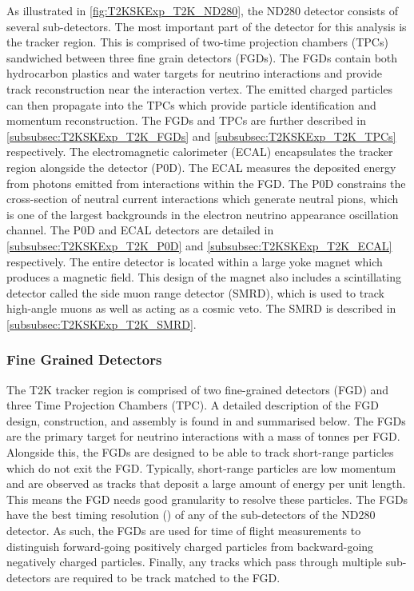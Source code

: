 As illustrated in \autoref{fig:T2KSKExp_T2K_ND280}, the ND280 detector consists of several sub-detectors. The most important part of the detector for this analysis is the tracker region. This is comprised of two-time projection chambers (TPCs) sandwiched between three fine grain detectors (FGDs). The FGDs contain both hydrocarbon plastics and water targets for neutrino interactions and provide track reconstruction near the interaction vertex. The emitted charged particles can then propagate into the TPCs which provide particle identification and momentum reconstruction. The FGDs and TPCs are further described in \autoref{subsubsec:T2KSKExp_T2K_FGDs} and \autoref{subsubsec:T2KSKExp_T2K_TPCs} respectively. The electromagnetic calorimeter (ECAL) encapsulates the tracker region alongside the  detector (P0D). The ECAL measures the deposited energy from photons emitted from interactions within the FGD. The P0D constrains the cross-section of neutral current interactions which generate neutral pions, which is one of the largest backgrounds in the electron neutrino appearance oscillation channel. The P0D and ECAL detectors are detailed in \autoref{subsubsec:T2KSKExp_T2K_P0D} and \autoref{subsubsec:T2KSKExp_T2K_ECAL} respectively. The entire detector is located within a large yoke magnet which produces a  magnetic field. This design of the magnet also includes a scintillating detector called the side muon range detector (SMRD), which is used to track high-angle muons as well as acting as a cosmic veto. The SMRD is described in \autoref{subsubsec:T2KSKExp_T2K_SMRD}.  

\subsubsection{Fine Grained Detectors}
\label{subsubsec:T2KSKExp_T2K_FGDs}

The T2K tracker region is comprised of two fine-grained detectors (FGD) and three Time Projection Chambers (TPC). A detailed description of the FGD design, construction, and assembly is found in \cite{Amaudruz2012} and summarised below. The FGDs are the primary target for neutrino interactions with a mass of  tonnes per FGD.
Alongside this, the FGDs are designed to be able to track short-range particles which do not exit the FGD. Typically, short-range particles are low momentum and are observed as tracks that deposit a large amount of energy per unit length. This means the FGD needs good granularity to resolve these particles. The FGDs have the best timing resolution () of any of the sub-detectors of the ND280 detector. As such, the FGDs are used for time of flight measurements to distinguish forward-going positively charged particles from backward-going negatively charged particles. Finally, any tracks which pass through multiple sub-detectors are required to be track matched to the FGD.

